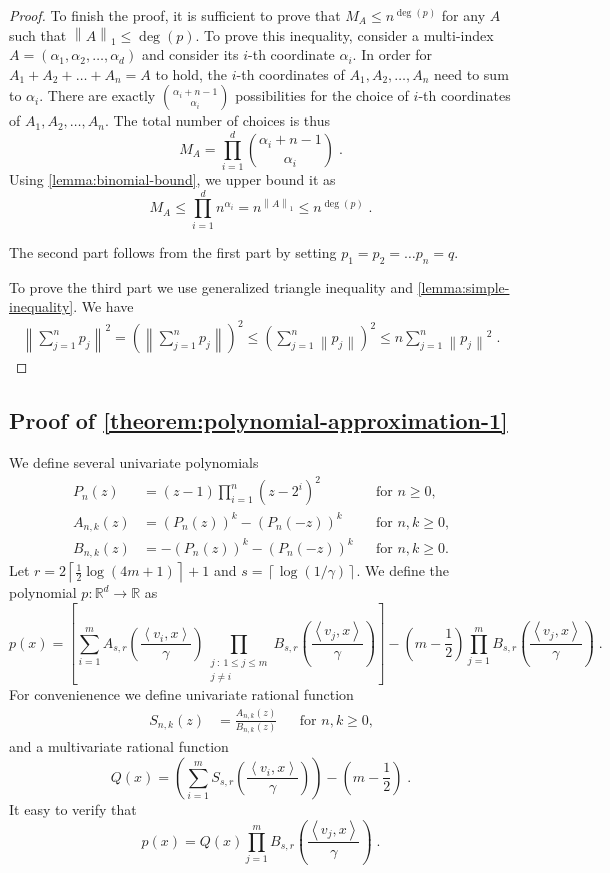 \documentclass[12pt]{article}
\newcommand{\R}{\mathbb{R}}  %
\newcommand{\ip}[2]{\left\langle #1, #2 \right\rangle} %
\newcommand{\norm}[1]{\left\| #1 \right\|}  %
\begin{document}
\begin{proof}
To finish the proof, it is sufficient to prove that $M_A \le n^{\deg(p)}$ for
any $A$ such that $\norm{A}_1 \le \deg(p)$. To prove this inequality, consider a
multi-index $A = (\alpha_1, \alpha_2, \dots, \alpha_d)$ and consider its $i$-th coordinate
$\alpha_i$. In order for $A_1 + A_2 + \dots + A_n = A$ to hold, the $i$-th
coordinates of $A_1, A_2, \dots, A_n$ need to sum to $\alpha_i$. There are exactly
$\binom{\alpha_i + n - 1}{\alpha_i}$ possibilities for the choice of $i$-th
coordinates of $A_1, A_2, \dots, A_n$. The total number of choices is thus
$$
M_A = \prod_{i=1}^d \binom{\alpha_i + n - 1}{\alpha_i} \; .
$$
Using \autoref{lemma:binomial-bound}, we upper bound it as
$$
M_A \le \prod_{i=1}^d n^{\alpha_i} = n^{\norm{A}_1} \le n^{\deg(p)} \; .
$$

The second part follows from the first part by setting $p_1 = p_2 = \dots p_n = q$.

To prove the third part we use generalized triangle inequality and
\autoref{lemma:simple-inequality}. We have
\begin{align*}
\norm{\sum_{j=1}^n p_j}^2 = \left( \norm{\sum_{j=1}^n p_j} \right)^2 \le \left(\sum_{j=1}^n \norm{p_j} \right)^2 \le n \sum_{j=1}^n \norm{p_j}^2 \; .
\end{align*}
\end{proof}

\subsection{Proof of \autoref{theorem:polynomial-approximation-1}}
\label{section:proof-of-polynomial-approximation-1}

We define several univariate polynomials
\begin{align*}
P_n(z) & = (z - 1) \prod_{i=1}^n (z - 2^i)^2 && \text{for $n \ge 0$,} \\
A_{n,k}(z) & = (P_n(z))^k - (P_n(-z))^k && \text{for $n,k \ge 0$,} \\
B_{n,k}(z) & = - (P_n(z))^k - (P_n(-z))^k && \text{for $n,k \ge 0$.}
\end{align*}
Let $r = 2 \left\lceil \frac{1}{2} \log(4m + 1) \right\rceil + 1$ and $s = \left \lceil \log(1/\gamma) \right \rceil$.
We define the polynomial $p:\R^d \to \R$ as
$$
p(x) = \left[ \sum_{i=1}^m A_{s,r}\left( \frac{\ip{v_i}{x}}{\gamma} \right) \prod_{\substack{j ~:~ 1 \le j \le m \\ j \neq i}} B_{s,r} \left( \frac{\ip{v_j}{x}}{\gamma} \right) \right]
- \left(m - \frac{1}{2} \right) \prod_{j=1}^m B_{s,r} \left( \frac{\ip{v_j}{x}}{\gamma} \right) \; .
$$
For convenienence we define univariate rational function
\begin{align*}
S_{n,k}(z) & = \frac{A_{n,k}(z)}{B_{n,k}(z)} && \text{for $n,k \ge 0$,}
\end{align*}
and a multivariate rational function
$$
Q(x) = \left( \sum_{i=1}^m S_{s,r}\left( \frac{\ip{v_i}{x}}{\gamma} \right) \right) - \left(m - \frac{1}{2} \right) \; .
$$
It easy to verify that
$$
p(x) = Q(x) \prod_{j=1}^m B_{s,r} \left( \frac{\ip{v_j}{x}}{\gamma} \right) \; .
$$
\end{document}
